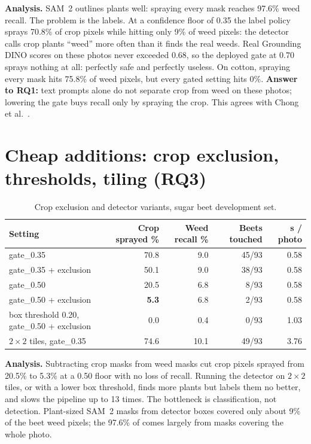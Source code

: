 \textbf{Analysis.} SAM~2 outlines plants well: spraying every mask reaches 97.6\% weed recall. The
problem is the labels. At a confidence floor of 0.35 the label policy sprays 70.8\% of crop pixels
while hitting only 9\% of weed pixels: the detector calls crop plants ``weed'' more often than it
finds the real weeds. Real Grounding DINO scores on these photos never exceeded 0.68, so the deployed
gate at 0.70 sprays nothing at all: perfectly safe and perfectly useless. On cotton, spraying every
mask hits 75.8\% of weed pixels, but every gated setting hits 0\%. \textbf{Answer to RQ1:} text prompts
alone do not separate crop from weed on these photos; lowering the gate buys recall only by spraying
the crop. This agrees with Chong et al.~\cite{chong2025zeroshot}.

\section{Cheap additions: crop exclusion, thresholds, tiling (RQ3)}\label{sec:cheap}
\begin{table}[H]
\centering
\caption{Crop exclusion and detector variants, sugar beet development set.}\label{tab:cheap}
\begin{small}
\begin{tabularx}{\textwidth}{@{}L{5.0cm}RRRR@{}}
\toprule
\textbf{Setting} & \textbf{Crop sprayed \%} & \textbf{Weed recall \%} & \textbf{Beets touched} & \textbf{s / photo}\\
\midrule
gate\_0.35 & 70.8 & 9.0 & 45/93 & 0.58\\
gate\_0.35 + exclusion & 50.1 & 9.0 & 38/93 & 0.58\\
gate\_0.50 & 20.5 & 6.8 & 8/93 & 0.58\\
gate\_0.50 + exclusion & \textbf{5.3} & 6.8 & 2/93 & 0.58\\
box threshold 0.20, gate\_0.50 + exclusion & 0.0 & 0.4 & 0/93 & 1.03\\
$2\times2$ tiles, gate\_0.35 & 74.6 & 10.1 & 49/93 & 3.76\\
\bottomrule
\end{tabularx}
\end{small}
\end{table}

\textbf{Analysis.} Subtracting crop masks from weed masks cut crop pixels sprayed from 20.5\% to 5.3\%
at a 0.50 floor with no loss of recall. Running the detector on $2\times2$ tiles, or with a lower box
threshold, finds more plants but labels them no better, and slows the pipeline up to 13 times. The
bottleneck is classification, not detection. Plant-sized SAM~2 masks from detector boxes covered only
about 9\% of the beet weed pixels; the 97.6\% of  comes largely from masks covering the
whole photo.

